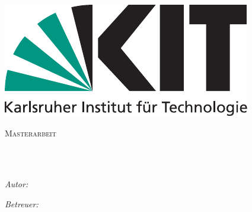 \documentclass[
11pt, %
ngerman, %
singlespacing, %
nohyperref, %
headsepline, %
hidelinks,
]{MastersDoctoralThesis} %
\author{Daniel \textsc{Dittmar}} %
\begin{document}
\frontmatter %

\pagestyle{plain} %


\begin{titlepage}
\begin{center}
\includegraphics{Figures/kitlogo_de_rgb.pdf} %
\linebreak
\vspace*{.06\textheight}
{\scshape\LARGE \univname\par}\vspace{1.5cm} %
\textsc{\Large Masterarbeit}\\[0.5cm] %

\HRule \\[0.4cm] %
{\huge \bfseries \ttitle\par}\vspace{0.4cm} %
\HRule \\[1.5cm] %
 
\begin{minipage}[t]{0.4\textwidth}
\begin{flushleft} \large
\emph{Autor:}\\
{\authorname} %
\end{flushleft}
\end{minipage}
\begin{minipage}[t]{0.4\textwidth}
\begin{flushright} \large
\emph{Betreuer:} \\
\href{http://www.math.kit.edu/ianm3/~jahnke}{\supname} %
\end{flushright}
\end{minipage}\\[3cm]
 

\end{center}
\end{titlepage}
\end{document}
